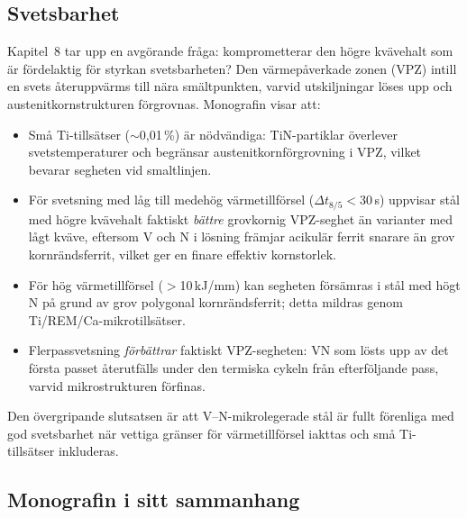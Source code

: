 \documentclass[11pt,a4paper]{article}
\begin{document}
\subsection{Svetsbarhet}

Kapitel~8 tar upp en avg\"orande fr\aa{}ga: komprometterar den h\"ogre
kv\"avehalt som \"ar f\"ordelaktig f\"or styrkan svetsbarheten?  Den
v\"armep\aa{}verkade zonen (VPZ) intill en svets \aa{}teruppv\"arms till
n\"ara sm\"altpunkten, varvid utskiljningar l\"oses upp och
austenitkornstrukturen f\"orgrovnas.  Monografin visar att:

\begin{itemize}
  \item Sm\aa{} Ti-tills\"atser ($\sim$0,01\,\%) \"ar n\"odv\"andiga:
    TiN-partiklar \"overlever svetstemperaturer och begr\"ansar
    austenitkornf\"orgrovning i VPZ, vilket bevarar segheten vid
    smaltlinjen.
  \item F\"or svetsning med l\aa{}g till medeh\"og v\"armetillf\"orsel
    ($\Delta t_{8/5} < 30$\,s) uppvisar st\aa{}l med h\"ogre kv\"avehalt
    faktiskt \emph{b\"attre} grovkornig VPZ-seghet \"an varianter med
    l\aa{}gt kv\"ave, eftersom V och N i l\"osning fr\"amjar acikul\"ar
    ferrit snarare \"an grov kornr\"andsferrit, vilket ger en finare
    effektiv kornstorlek.
  \item F\"or h\"og v\"armetillf\"orsel ($>$10\,kJ/mm) kan segheten
    f\"ors\"amras i st\aa{}l med h\"ogt N p\aa{} grund av grov
    polygonal kornr\"andsferrit; detta mildras genom
    Ti/REM/Ca-mikrotills\"atser.
  \item Flerpassvetsning \emph{f\"orb\"attrar} faktiskt VPZ-segheten:
    VN som l\"osts upp av det f\"orsta passet \aa{}terutf\"alls under
    den termiska cykeln fr\aa{}n efterf\"oljande pass, varvid
    mikrostrukturen f\"orfinas.
\end{itemize}

Den \"overgripande slutsatsen \"ar att V--N-mikrolegerade st\aa{}l \"ar
fullt f\"orenliga med god svetsbarhet n\"ar vettiga gr\"anser f\"or
v\"armetillf\"orsel iakttas och sm\aa{} Ti-tills\"atser inkluderas.

\subsection{Monografin i sitt sammanhang}
\end{document}
